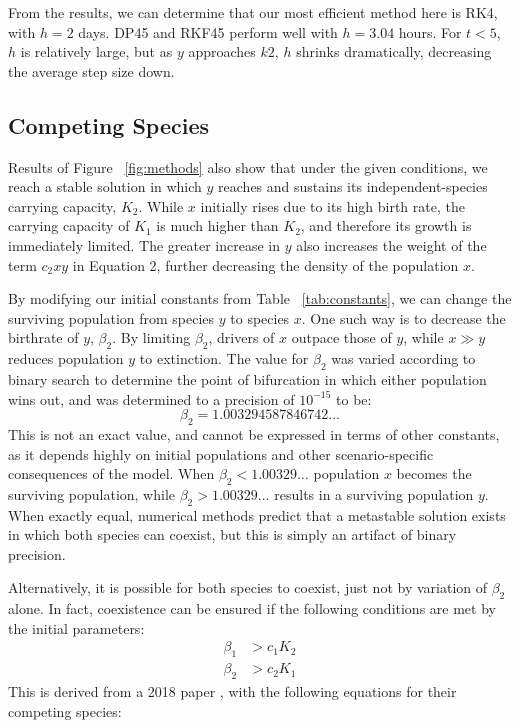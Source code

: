 From the results, we can determine that our most efficient method here is RK4, with $h = 2$ days. DP45 and RKF45 perform well with $h = 3.04$ hours. For $t<5$, $h$ is relatively large, but as $y$ approaches $k2$, $h$ shrinks dramatically, decreasing the average step size down.


\subsection{Competing Species}
Results of Figure ~\ref{fig:methods} also show that under the given conditions, we reach a stable solution in which $y$ reaches and sustains its independent-species carrying capacity, $K_2$. 
While $x$ initially rises due to its high birth rate, the carrying capacity of $K_1$ is much higher than $K_2$, and therefore its growth is immediately limited. 
The greater increase in $y$ also increases the weight of the term $c_2xy$ in Equation 2, further decreasing the density of the population $x$.

By modifying our initial constants from Table ~\ref{tab:constants}, we can change the surviving population from species $y$ to species $x$. 
One such way is to decrease the birthrate of $y$, $\beta_2$. 
By limiting $\beta_2$, drivers of $x$ outpace those of $y$, while $x \gg y$ reduces population $y$ to extinction.
The value for $\beta_2$ was varied according to binary search to determine the point of bifurcation in which either population wins out, and was determined to a precision of $10^{-15}$ to be:
$$\beta_2 = 1.003294587846742\dots$$
This is not an exact value, and cannot be expressed in terms of other constants, as it depends highly on initial populations and other scenario-specific consequences of the model.
When $\beta_2 < 1.00329\dots$ population $x$ becomes the surviving population, while $\beta_2 > 1.00329\dots$ results in a surviving population $y$.
When exactly equal, numerical methods predict that a metastable solution exists in which both species can coexist, but this is simply an artifact of binary precision.

Alternatively, it is possible for both species to coexist, just not by variation of $\beta_2$ alone. In fact, coexistence can be ensured if the following conditions are met by the initial parameters:
\begin{equation}
\label{eq:stability-conditions}
\begin{aligned}
    \beta_1 &> c_1 K_2 \\
    \beta_2 &> c_2 K_1
\end{aligned}
\end{equation}
This is derived from a 2018 paper \cite{Gavina2018}, with the following equations for their competing species: 

